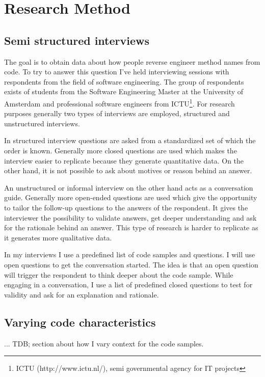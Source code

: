 \section{Research Method}

\subsection{Semi structured interviews}
The goal is to obtain data about how people reverse engineer method names from code. To try to answer this question I've held interviewing sessions with respondents from the field of software engineering. The group of respondents exists of students from the Software Engineering Master at the University of Amsterdam and professional software engineers from ICTU\footnote{ICTU (http://www.ictu.nl/), semi governmental agency for IT projects}. For research purposes generally two types of interviews are employed, structured and unstructured interviews.

In structured interview questions are asked from a standardized set of which the order is known. Generally more closed questions are used which makes the interview easier to replicate because they generate quantitative data. On the other hand, it is not possible to ask about motives or reason behind an answer.

An unstructured or informal interview on the other hand acts as a conversation guide. Generally more open-ended questions are used which give the opportunity to tailor the follow-up questions to the answers of the respondent. It gives the interviewer the possibility to validate answers, get deeper understanding and ask for the rationale behind an answer. This type of research is harder to replicate as it generates more qualitative data.

In my interviews I use a predefined list of code samples and questions. I will use open questions to get the conversation started. The idea is that an open question will trigger the respondent to think deeper about the code sample. While engaging in a conversation, I use a list of predefined closed questions to test for validity and ask for an explanation and rationale.

\subsection{Varying code characteristics}
... TDB; section about how I vary context for the code samples.